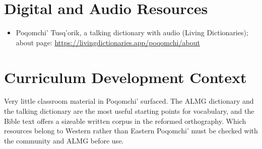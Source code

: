 \documentclass[12pt]{article}
\begin{document}
\section{Digital and Audio Resources}
\begin{itemize}
\item Poqomchi' Tusq'orik, a talking dictionary with audio (Living Dictionaries); about page: \url{https://livingdictionaries.app/poqomchi/about}
\end{itemize}

\section{Curriculum Development Context}
Very little classroom material in Poqomchi' surfaced. The ALMG dictionary and the talking dictionary are the most useful starting points for vocabulary, and the Bible text offers a sizeable written corpus in the reformed orthography. Which resources belong to Western rather than Eastern Poqomchi' must be checked with the community and ALMG before use.
\end{document}
